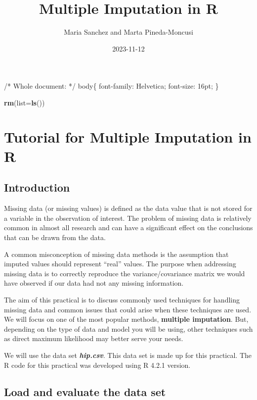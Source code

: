 \documentclass[
]{article}
\title{Multiple Imputation in R}
\author{Maria Sanchez and Marta Pineda-Moncusi}
\date{2023-11-12}
\newenvironment{Shaded}{\begin{snugshade}}{\end{snugshade}}
\newcommand{\AttributeTok}[1]{\textcolor[rgb]{0.13,0.29,0.53}{#1}}
\newcommand{\FunctionTok}[1]{\textcolor[rgb]{0.13,0.29,0.53}{\textbf{#1}}}
\newcommand{\NormalTok}[1]{#1}
\begin{document}
\maketitle

/* Whole document: */ body\{ font-family: Helvetica; font-size: 16pt; \}

\begin{Shaded}
\begin{Highlighting}[]
\FunctionTok{rm}\NormalTok{(}\AttributeTok{list=}\FunctionTok{ls}\NormalTok{())}
\end{Highlighting}
\end{Shaded}

\hypertarget{tutorial-for-multiple-imputation-in-r}{%
\section{Tutorial for Multiple Imputation in
R}\label{tutorial-for-multiple-imputation-in-r}}

\hypertarget{introduction}{%
\subsection{Introduction}\label{introduction}}

Missing data (or missing values) is defined as the data value that is
not stored for a variable in the observation of interest. The problem of
missing data is relatively common in almost all research and can have a
significant effect on the conclusions that can be drawn from the data.

A common misconception of missing data methods is the assumption that
imputed values should represent ``real'' values. The purpose when
addressing missing data is to correctly reproduce the
variance/covariance matrix we would have observed if our data had not
any missing information.

The aim of this practical is to discuss commonly used techniques for
handling missing data and common issues that could arise when these
techniques are used. We will focus on one of the most popular methods,
\textbf{multiple imputation}. But, depending on the type of data and
model you will be using, other techniques such as direct maximum
likelihood may better serve your needs.

We will use the data set \textbf{\emph{hip.csv}}. This data set is made
up for this practical. The R code for this practical was developed using
R 4.2.1 version.

\hypertarget{load-and-evaluate-the-data-set}{%
\subsection{Load and evaluate the data
set}\label{load-and-evaluate-the-data-set}}
\end{document}

